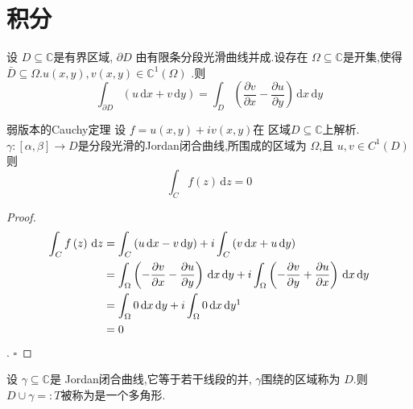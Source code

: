 \documentclass[../../复变函数.tex]{subfiles}
\begin{document}
\ifSubfilesClassLoaded{
    \frontmatter

    \tableofcontents
    
    \mainmatter
    \setcounter{chapter}{3}
}{}

\chapter{积分}


\begin{theorem}
    设 \(  D\subseteq \mathbb{C}   \)是有界区域, \(  \partial D  \)  由有限条分段光滑曲线并成.设存在 \(   \Omega \subseteq \mathbb{C}   \)是开集,使得 \(  \bar{D}\subseteq  \Omega   \).\(  u\left( x,y \right),v\left( x,y \right)\in \mathbb{C} ^{1}\left(  \Omega  \right)     \)   .则 \[
    \int_{\partial D}\left( u\,\mathrm{d} x+ v\,\mathrm{d} y \right)= \int_{D}\left( \frac{\partial v}{\partial x}-\frac{\partial u}{\partial y} \right)\,\mathrm{d} x\,\mathrm{d} y  
    \]
\end{theorem}

\begin{corollary}{弱版本的Cauchy定理}
    设 \(  f= u\left( x,y \right)+ iv\left( x,y \right)    \)在 区域\(  D\subseteq \mathbb{C}   \)上解析. \(   \gamma : \left[  \alpha ,\beta  \right]\to D   \)是分段光滑的Jordan闭合曲线,所围成的区域为 \(   \Omega   \),且 \(  u,v \in C^{1}\left( D \right)   \) 则 \[
    \int_{C}f\left( z \right)\,\mathrm{d} z= 0 
    \]    
\end{corollary}

\begin{proof}
    \[
 \begin{aligned}
    \int_{C}f\left( z \right)\,\mathrm{d} z& = \int_{C}\left( u\,\mathrm{d} x-v\,\mathrm{d} y \right)+  i \int_{C} \left( v\,\mathrm{d} x+ u\,\mathrm{d} y \right)   \\ 
     & =  \int_{ \Omega }\left( -\frac{\partial v}{\partial x}-\frac{\partial u}{\partial y} \right)\,\mathrm{d} x\,\mathrm{d} y+ i \int_{ \Omega }\left( -\frac{\partial v}{\partial y}+ \frac{\partial u}{\partial x} \right)\,\mathrm{d} x\,\mathrm{d} y\\ 
      & =  \int_{ \Omega }0 \,\mathrm{d} x\,\mathrm{d} y+ i \int_{ \Omega }0\,\mathrm{d} x\,\mathrm{d} y\footnotemark \\ 
       & = 0  
 \end{aligned}
    \]
.
    \hfill $\square$
\end{proof}

\begin{definition}
    设 \(   \gamma \subseteq \mathbb{C}   \)是 Jordan闭合曲线,它等于若干线段的并,  \(   \gamma   \)围绕的区域称为 \(  D  \).则 \(  D\cup  \gamma = :T  \)被称为是一个多角形.    
\end{definition}
\end{document}
